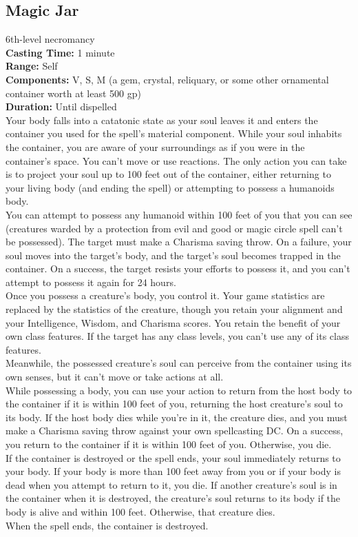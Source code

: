 \documentclass[11pt, A4paper, english]{article}
\begin{document}
		\subsection{Magic Jar}
6th-level necromancy \\
\textbf{Casting Time:} 1 minute \\
\textbf{Range:} Self \\
\textbf{Components:} V, S, M (a gem, crystal, reliquary, or some other ornamental container worth at least 500 gp) \\
\textbf{Duration:} Until dispelled \\
Your body falls into a catatonic state as your soul leaves it and enters the container you used for the spell’s material component. While your soul inhabits the container, you are aware of your surroundings as if you were in the container’s space. You can’t move or use reactions. The only action you can take is to project your soul up to 100 feet out of the container, either returning to your living body (and ending the spell) or attempting to possess a humanoids body. \\
You can attempt to possess any humanoid within 100 feet of you that you can see (creatures warded by a protection from evil and good or magic circle spell can’t be possessed). The target must make a Charisma saving throw. On a failure, your soul moves into the target’s body, and the target’s soul becomes trapped in the container. On a success, the target resists your efforts to possess it, and you can’t attempt to possess it again for 24 hours. \\
Once you possess a creature’s body, you control it. Your game statistics are replaced by the statistics of the creature, though you retain your alignment and your Intelligence, Wisdom, and Charisma scores. You retain the benefit of your own class features. If the target has any class levels, you can’t use any of its class features. \\
Meanwhile, the possessed creature’s soul can perceive from the container using its own senses, but it can’t move or take actions at all. \\
While possessing a body, you can use your action to return from the host body to the container if it is within 100 feet of you, returning the host creature’s soul to its body. If the host body dies while you’re in it, the creature dies, and you must make a Charisma saving throw against your own spellcasting DC. On a success, you return to the container if it is within 100 feet of you. Otherwise, you die. \\
If the container is destroyed or the spell ends, your soul immediately returns to your body. If your body is more than 100 feet away from you or if your body is dead when you attempt to return to it, you die. If another creature’s soul is in the container when it is destroyed, the creature’s soul returns to its body if the body is alive and within 100 feet. Otherwise, that creature dies. \\
When the spell ends, the container is destroyed.
\end{document}
